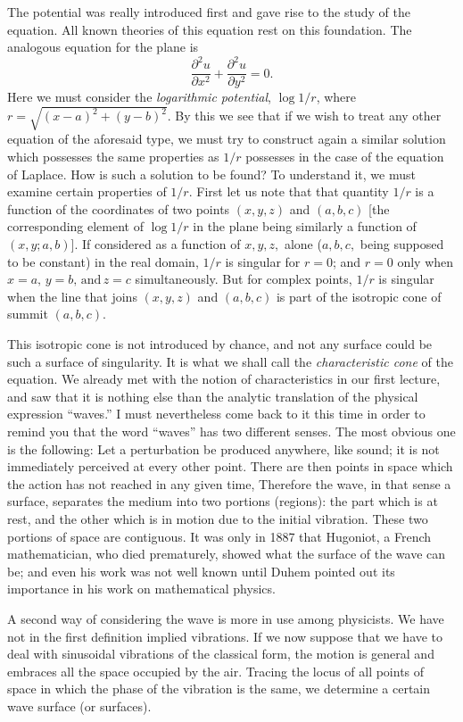 \documentclass[12pt,oneside]{book}
\begin{document}
The potential was really introduced first and gave rise to the study of the
equation. All known theories of this equation rest on  this foundation. The
analogous equation for the plane is
$$\frac{\partial^2u}{\partial x^2}+\frac{\partial^2 u}{\partial y^2}=0.$$
Here we must consider the \textit{logarithmic potential}, $\log 1/r$, where
$r=\sqrt{(x-a)^2+(y-b)^2}$. By this we see that if we wish to treat any other
equation of the aforesaid type, we must try to construct again a similar
solution which possesses the same properties as $1/r$ possesses in the case of
the equation of Laplace. How is such a solution to be found? To understand it,
we must examine certain properties of $1/r$. First let us note that that
quantity $1/r$ is a function of the coordinates of two points $(x,y,z)$ and
$(a,b,c)$ [the corresponding element of $\log 1/r$ in the plane being similarly a
function of $(x,y;a,b)$]. If considered as a function of $x,y,z,$ alone
($a,b,c,$ being supposed to be constant) in the real domain, $1/r$ is singular
for $r=0$; and $r=0$ only when $x=a,\, y=b,\,\text{and}\, z=c$ simultaneously.
But for complex points, $1/r$ is singular when the line that joins $(x,y,z)$ and
$(a,b,c)$ is part of the isotropic cone of summit $(a,b,c)$. \par

This isotropic cone is not introduced by chance, and not any surface could be
such a surface of singularity. It is what we shall call the
\textit{characteristic cone} of the equation. We already met with the notion of
characteristics in our first lecture, and saw that it is nothing else than the
analytic translation of the physical expression ``waves.'' I must nevertheless
come back to it this time in order to remind you that the word ``waves'' has two
different senses. The most obvious one is the following: Let a perturbation be
produced anywhere, like sound; it is not immediately perceived at every other
point. There are then points in space which the action has not reached in any
given time, Therefore the wave, in that sense a surface, separates the medium
into two portions (regions): the part which is at rest, and the other which is
in motion due to the initial vibration. These two portions of space are
contiguous. It was only in 1887 that Hugoniot, a French mathematician, who died
prematurely, showed what the surface of the wave can be; and even his work was
not well known until Duhem pointed out its importance in his work on
mathematical physics. \par

A second way of considering the wave is more in use among physicists. We have
not in the first definition implied vibrations. If we now suppose that we have to
deal with sinusoidal vibrations of the classical form, the motion is general and
embraces all the space occupied by the air. Tracing the locus of all points of
space in which the phase of the vibration is the same, we determine a certain
wave surface (or surfaces). \par
\end{document}
